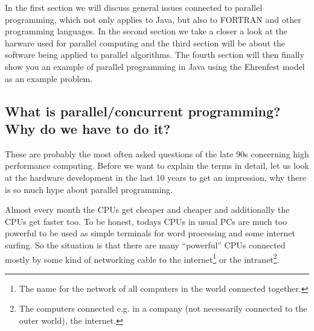 In the first section we will discuss general issues connected to
parallel programming, which not only applies to Java, but
also to FORTRAN and other programming languages. In the second section
we take a closer a look at the harware used for parallel computing and
the third section will be about the software being applied to
parallel algorithms. The fourth section will then finally show you an
example of parallel programming in Java using the Ehrenfest model as an
example problem.

\subsection{What is parallel/concurrent programming?  \\
            Why do we have to do it?}

These are probably the most often asked questions of the late 90s
concerning high performance computing. 
Before we want to explain the terms in detail, let us look
at the hardware development in the last 10 years to get an impression,
why there is so much hype about parallel programming. 

Almost every month the CPUs get cheaper and cheaper and additionally
the CPUs get faster too. To be honest, todays CPUs in usual PCs
are much too powerful to be used as simple terminals for word 
processing and some internet surfing. So the situation is that
there are many ``powerful'' CPUs connected mostly by some kind
of networking cable to the internet\footnote{The name for the network of
all computers in the world connected together.} 
or the intranet\footnote{The computers connected e.g. in a company 
(not necessarily connected to the outer world), the internet.}.

